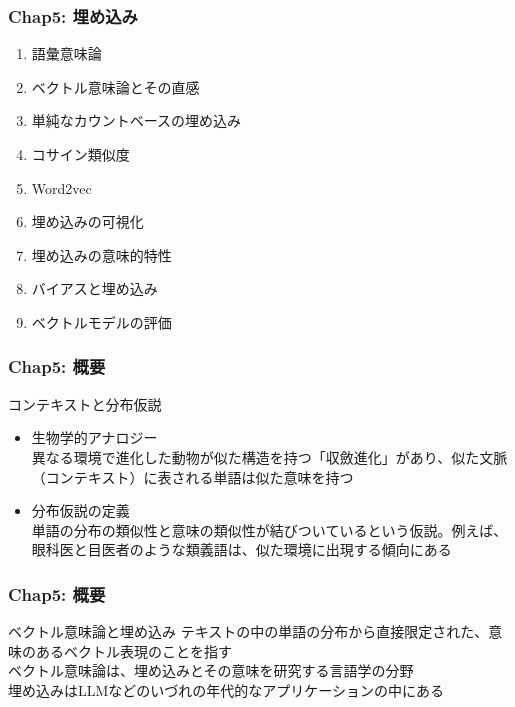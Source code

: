 \documentclass[unicode,11pt]{beamer} %
\begin{document}
\begin{frame}
    \frametitle{Chap5: 埋め込み}
    \begin{block}{}
        \begin{enumerate}
            \item 語彙意味論
            \item ベクトル意味論とその直感
            \item 単純なカウントベースの埋め込み
            \item コサイン類似度
            \item Word2vec
            \item 埋め込みの可視化
            \item 埋め込みの意味的特性
            \item バイアスと埋め込み
            \item ベクトルモデルの評価
        \end{enumerate}
    \end{block}
\end{frame}

\begin{frame}
    \frametitle{Chap5: 概要}
    \begin{alertblock}{コンテキストと分布仮説}
        \begin{itemize}
            \item 生物学的アナロジー\\異なる環境で進化した動物が似た構造を持つ「収斂進化」があり、似た文脈（コンテキスト）に表される単語は似た意味を持つ
            \item 分布仮説の定義\\単語の分布の類似性と意味の類似性が結びついているという仮説。例えば、眼科医と目医者のような類義語は、似た環境に出現する傾向にある
        \end{itemize}
    \end{alertblock}
\end{frame}

\begin{frame}
    \frametitle{Chap5: 概要}
    \begin{alertblock}{ベクトル意味論と埋め込み}
        テキストの中の単語の分布から直接限定された、意味のあるベクトル表現のことを指す
        \\ベクトル意味論は、埋め込みとその意味を研究する言語学の分野
        \\埋め込みはLLMなどのいづれの年代的なアプリケーションの中にある
    \end{alertblock}
\end{frame}
\end{document}
